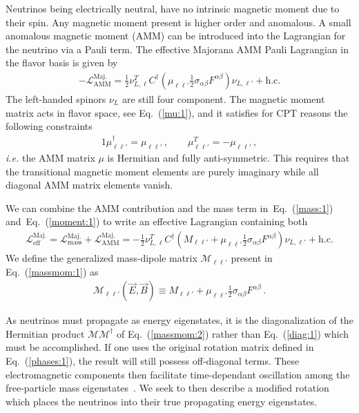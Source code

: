 \documentclass[addchapnum]{ws-rv961x669} %
\newcommand{\req}[1]{Eq.~(\ref{#1})}
\begin{document}
Neutrinos being electrically neutral, have no intrinsic magnetic moment due to their spin. Any magnetic moment present is higher order and anomalous. A small anomalous magnetic moment (AMM) can be introduced into the Lagrangian for the neutrino via a Pauli term. The effective Majorana AMM Pauli Lagrangian in the flavor basis is given by~\cite{Shrock:1980vy}
\begin{align}
	\label{moment:1} -\mathcal{L}_{\mathrm{AMM}}^\mathrm{Maj.}=\frac{1}{2}\nu_{L,\ell}^{T}C^{\dag}\left(\mu_{\ell\ell'}\frac{1}{2}\sigma_{\alpha\beta}F^{\alpha\beta}\right)\nu_{L,\ell'}+\mathrm{h.c.}
\end{align}
The left-handed spinors $\nu_{L}$ are still four component. The magnetic moment matrix acts in flavor space, see \req{mu:1}, and it satisfies for CPT reasons the following constraints~\cite{Giunti:2014ixa}
\begin{alignat}{1}
	\label{props:1}
    \mu_{\ell\ell'}^{\dag}=\mu_{\ell\ell'}\,,\qquad
    \mu_{\ell\ell'}^{T}=-\mu_{\ell\ell'}\,,
\end{alignat}
{\it i.e.\/} the AMM matrix $\mu$ is Hermitian and fully anti-symmetric. This requires that the transitional magnetic moment elements are purely imaginary while all diagonal AMM matrix elements vanish.

We can combine the AMM contribution and the mass term in~\req{mass:1} and~\req{moment:1} to write an effective Lagrangian containing both
\begin{align}
	\label{massmom:1}
    \mathcal{L}_\mathrm{eff}^\mathrm{Maj.} =
    \mathcal{L}_\mathrm{mass}^\mathrm{Maj.} + \mathcal{L}_\mathrm{AMM}^\mathrm{Maj.} = 
    -\frac{1}{2}\nu_{L,\ell}^{T}C^{\dag}\left(M_{\ell\ell'}+\mu_{\ell\ell'}\frac{1}{2}\sigma_{\alpha\beta}F^{\alpha\beta}\right)\nu_{L,\ell'}+\mathrm{h.c.}
\end{align}
We define the generalized mass-dipole matrix $\mathcal{M}_{\ell\ell'}$ present in \req{massmom:1} as
\begin{align}
	\label{massmom:2}
    \mathcal{M}_{\ell\ell'}(\vec{E},\vec{B})\equiv M_{\ell\ell'}+\mu_{\ell\ell'}\frac{1}{2}\sigma_{\alpha\beta}F^{\alpha\beta}\,.
\end{align}

As neutrinos must propagate as energy eigenstates, it is the diagonalization of the Hermitian product $\mathcal{M}\mathcal{M}^{\dag}$ of \req{massmom:2} rather than \req{diag:1} which must be accomplished. If one uses the original rotation matrix defined in \req{phases:1}, the result will still possess off-diagonal terms. These electromagnetic components then facilitate time-dependant oscillation among the free-particle mass eigenstates~\cite{Giunti:2014ixa}. We seek to then describe a modified rotation which places the neutrinos into their true propagating energy eigenstates.
\end{document}
